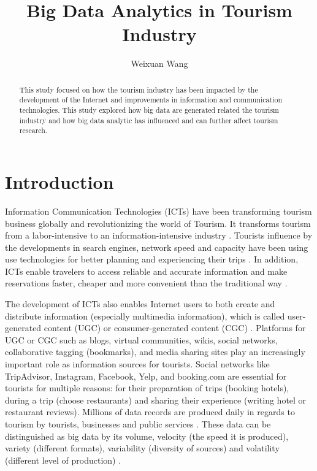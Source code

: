 \documentclass[sigconf]{acmart}
\begin{document}
\title{Big Data Analytics in Tourism Industry}


\author{Weixuan Wang}


\renewcommand{\shortauthors}{W. Wang}


\begin{abstract}
This study focused on how the tourism industry has been impacted by the
development of the Internet and improvements in information and communication
technologies. This study explored how big data are generated related the tourism
industry and how big data analytic has influenced and can further affect tourism
research.
\end{abstract}



\maketitle

\section{Introduction}

Information Communication Technologies (ICTs) have been transforming tourism business
globally and revolutionizing the world of Tourism. It transforms tourism from a
labor-intensive to an information-intensive industry \cite{Williams201787}.
Tourists influence by the developments in search engines, network speed and capacity 
have been using use technologies for better planning and experiencing their
trips \cite{XIE2017101}. In addition, ICTs enable travelers to access reliable and
accurate information and make reservations faster, cheaper and more convenient than
the traditional way \cite{chung2009}.


The development of ICTs also enables Internet users to both create and distribute
information (especially multimedia information), which is called user-generated 
content (UGC) or consumer-generated content (CGC) \cite{chung2009}. Platforms for UGC
or CGC such as blogs, virtual communities, wikis, social networks, collaborative 
tagging (bookmarks), and media sharing sites play an increasingly important role as 
information sources for tourists\cite{XIANG2015120}. Social networks like TripAdvisor, 
Instagram, Facebook, Yelp, and booking.com are essential for tourists for multiple 
reasons: for their preparation of trips (booking hotels), during a trip (choose 
restaurants) and sharing their experience (writing hotel or restaurant reviews). 
Millions of data records are produced daily in regards to tourism by tourists, 
businesses and public services \cite{Shafiee16}. These data can be distinguished
as big data by its volume, velocity (the speed it is produced), variety (different
formats), variability (diversity of sources) and volatility (different level of 
production) \cite{MIAH2017}. 
\end{document}
